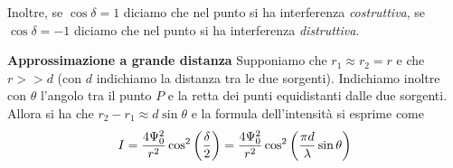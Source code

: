 \documentclass[10pt,a4paper]{article}
\begin{document}
\begin{multicols}{2}
  Inoltre, se $\cos \delta = 1$ diciamo che nel punto si ha interferenza {\it costruttiva}, se $\cos \delta = -1$ diciamo che nel punto si ha interferenza {\it distruttiva}.

  {\bf Approssimazione a grande distanza}
  Supponiamo che $r_1 \approx r_2 = r$ e che $r >> d$ (con $d$ indichiamo la distanza tra le due sorgenti). Indichiamo inoltre con $\theta$ l'angolo tra il punto $P$ e la retta dei punti equidistanti dalle due sorgenti. Allora si ha che $r_2 - r_1 \approx d \sin\theta$ e la formula dell'intensità si esprime come
  $$ I = \frac{4 \Psi_0^2}{r^2} \cos^2 \left({\frac{\delta}{2}}\right) = \frac{4 \Psi_0^2}{r^2} \cos^2 \left({\frac{\pi d}{\lambda} \sin\theta}\right) $$

\end{multicols}
\end{document}
